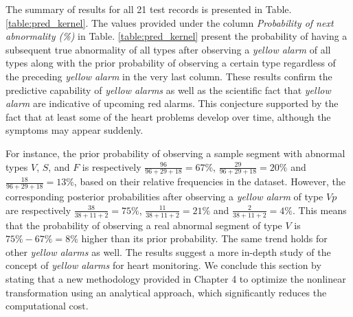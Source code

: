 The summary of results for all 21 test records is presented in Table. \ref{table:pred_kernel}. The values provided under the column \textit{Probability of next abnormality (\%)} in Table. \ref{table:pred_kernel} present the probability of having a subsequent true abnormality of all types after observing a \textit{yellow alarm} of all types along with the prior probability of observing a certain type regardless of the preceding \textit{yellow alarm} in the very last column. %
These results confirm the predictive capability of \textit{yellow alarms} as well as the scientific fact that \textit{yellow alarm} are indicative of upcoming red alarms. This conjecture supported by the fact that at least some of the heart problems develop over time, although the symptoms may appear suddenly. 
 
For instance, the prior probability of observing a sample segment with abnormal types $V$, $S$, and $F$ is respectively $\frac{96}{96+29+18}=67\%$, $\frac{29}{96+29+18}=20\%$ and $\frac{18}{96+29+18}=13\%$, based on their relative frequencies in the dataset. However, the corresponding posterior probabilities after observing a \textit{yellow alarm} of type $Vp$ are respectively $\frac{38}{38+11+2}=75\%$, $\frac{11}{38+11+2}=21\%$ and $\frac{2}{38+11+2}=4\%$. This means that the probability of observing a real abnormal segment of type $V$ is $75\%-67\%=8\%$ higher than its prior probability. The same trend holds for other \textit{yellow alarms} as well. The results suggest a more in-depth study of the concept of \textit{yellow alarms} for heart monitoring. 
We conclude this section by stating that a new methodology provided in Chapter 4 to optimize the nonlinear transformation using an analytical approach, which significantly reduces the computational cost.

